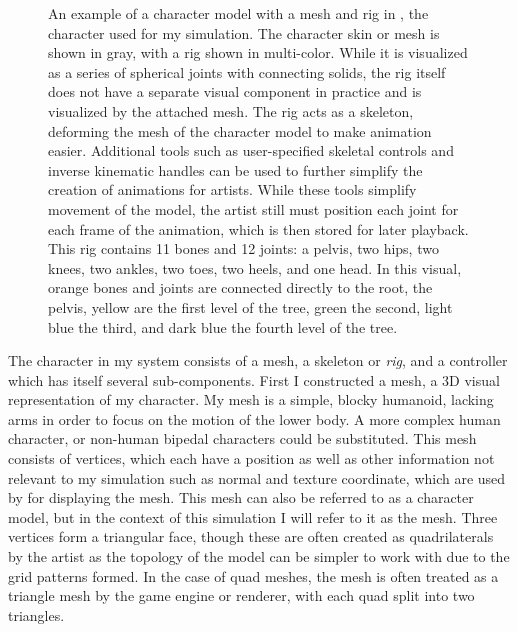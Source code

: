 \begin{figure}[htp]
\begin{subfigure}[b]{0.3\textwidth}
	\end{subfigure}
	\caption[Example of rigged 3D character model]{An example of a character model with a mesh and rig in \maya{}, the character used for my simulation.  The character skin or mesh is shown in gray, with a rig shown in multi-color.  While it is visualized as a series of spherical joints with connecting solids, the rig itself does not have a separate visual component in practice and is visualized by the attached mesh.  The rig acts as a skeleton, deforming the mesh of the character model to make animation easier.  Additional tools such as user-specified skeletal controls and inverse kinematic handles can be used to further simplify the creation of animations for artists.  While these tools simplify movement of the model, the artist still must position each joint for each frame of the animation, which is then stored for later playback.  This rig contains 11 bones and 12 joints: a pelvis, two hips, two knees, two ankles, two toes, two heels, and one head.  In this visual, orange bones and joints are connected directly to the root, the pelvis, yellow are the first level of the tree, green the second, light blue the third, and dark blue the fourth level of the tree.}
	\label{fig:rig_character}
\end{figure}

The character in my system consists of a mesh, a skeleton or \emph{rig}, and a controller which has itself several sub-components.  First I constructed a mesh, a 3D visual representation of my character.  My mesh is a simple, blocky humanoid, lacking arms in order to focus on the motion of the lower body.  A more complex human character, or non-human bipedal characters could be substituted.  This mesh consists of vertices, which each have a position as well as other information not relevant to my simulation such as normal and texture coordinate, which are used by \unity{} for displaying the mesh.  This mesh can also be referred to as a character model, but in the context of this simulation I will refer to it as the mesh.  Three vertices form a triangular face, though these are often created as quadrilaterals by the artist as the topology of the model can be simpler to work with due to the grid patterns formed.  In the case of quad meshes, the mesh is often treated as a triangle mesh by the game engine or renderer, with each quad split into two triangles.

